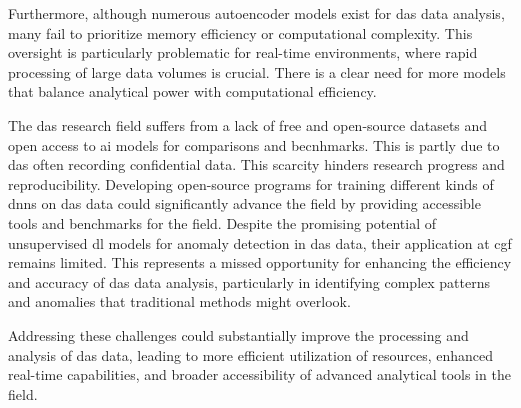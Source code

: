 Furthermore, although numerous autoencoder models exist for \acrshort{das} data analysis, many fail to prioritize memory efficiency or computational complexity. This oversight is particularly problematic for real-time environments, where rapid processing of large data volumes is crucial. There is a clear need for more models that balance analytical power with computational efficiency. 

The \acrshort{das} research field suffers from a lack of free and open-source datasets and open access to \acrshort{ai} models for comparisons and becnhmarks. This is partly due to \acrshort{das} often recording confidential data. This scarcity hinders research progress and reproducibility. Developing open-source programs for training different kinds of \acrshort{dnn}s on \acrshort{das} data could significantly advance the field by providing accessible tools and benchmarks for the field. Despite the promising potential of unsupervised \acrshort{dl} models for anomaly detection in \acrshort{das} data, their application at \acrshort{cgf} remains limited. This represents a missed opportunity for enhancing the efficiency and accuracy of \acrshort{das} data analysis, particularly in identifying complex patterns and anomalies that traditional methods might overlook.

Addressing these challenges could substantially improve the processing and analysis of \acrshort{das} data, leading to more efficient utilization of resources, enhanced real-time capabilities, and broader accessibility of advanced analytical tools in the field. 


